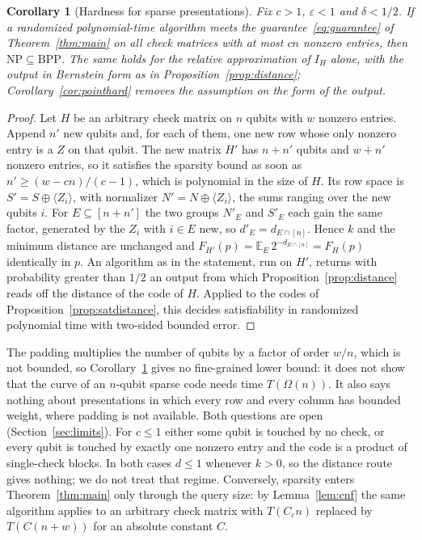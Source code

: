 \documentclass[11pt]{article}
\newtheorem{corollary}[theorem]{Corollary}
\theoremstyle{remark}
\newcommand{\E}{\mathbb E}
\newcommand{\eps}{\varepsilon}
\begin{document}
\begin{corollary}[Hardness for sparse presentations]\label{cor:sparsehard}
Fix \(c>1\), \(\eps<1\) and \(\delta<1/2\). If a randomized
polynomial-time algorithm meets the guarantee~\eqref{eq:guarantee} of
Theorem~\ref{thm:main} on all check matrices with at most \(cn\) nonzero
entries, then \(\mathrm{NP}\subseteq\mathrm{BPP}\). The same holds for
the relative approximation of \(I_H\) alone, with the output in
Bernstein form as in Proposition~\ref{prop:distance};
Corollary~\ref{cor:pointhard} removes the assumption on the form of the
output.
\end{corollary}
\begin{proof}
Let \(H\) be an arbitrary check matrix on \(n\) qubits with \(w\)
nonzero entries. Append \(n'\) new qubits and, for each of them, one new
row whose only nonzero entry is a \(Z\) on that qubit. The new matrix
\(H'\) has \(n+n'\) qubits and \(w+n'\) nonzero entries, so it satisfies
the sparsity bound as soon as \(n'\ge(w-cn)/(c-1)\), which is polynomial
in the size of \(H\). Its row space is \(S'=S\oplus\langle Z_i\rangle\),
with normalizer \(N'=N\oplus\langle Z_i\rangle\), the sums ranging over
the new qubits \(i\). For \(E\subseteq[n+n']\) the two groups \(N'_E\)
and \(S'_E\) each gain the same factor, generated by the \(Z_i\) with
\(i\in E\) new, so \(d'_E=d_{E\cap[n]}\). Hence \(k\) and the minimum
distance are unchanged and
\(F_{H'}(p)=\E_E\,2^{-d_{E\cap[n]}}=F_H(p)\) identically in \(p\). An
algorithm as in the statement, run on \(H'\), returns with probability
greater than \(1/2\) an output from which
Proposition~\ref{prop:distance} reads off the distance of the code of
\(H\). Applied to the codes of Proposition~\ref{prop:satdistance}, this
decides satisfiability in randomized polynomial time with two-sided
bounded error.
\end{proof}

The padding multiplies the number of qubits by a factor of order
\(w/n\), which is not bounded, so Corollary~\ref{cor:sparsehard} gives
no fine-grained lower bound: it does not show that the curve of an
\(n\)-qubit sparse code needs time \(T(\Omega(n))\). It also says nothing
about presentations in which every row and every column has bounded
weight, where padding is not available. Both questions are open
(Section~\ref{sec:limits}). For \(c\le1\) either some qubit is touched by
no check, or every qubit is touched by exactly one nonzero entry and the
code is a product of single-check blocks. In both cases \(d\le1\)
whenever \(k>0\), so the distance route gives nothing; we do not treat
that regime. Conversely, sparsity enters
Theorem~\ref{thm:main} only through the query size: by
Lemma~\ref{lem:cnf} the same algorithm applies to an arbitrary check
matrix with \(T(C_cn)\) replaced by \(T(C(n+w))\) for an absolute
constant \(C\).
\end{document}
